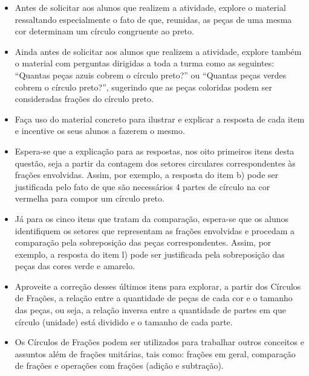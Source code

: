 \begin{multicols}{2}
\begin{orientacoes}
\begin{itemize}
    \item Antes de solicitar aos alunos que realizem a atividade, explore o material ressaltando especialmente o fato de que, reunidas, as peças de uma mesma cor determinam um círculo congruente ao preto.
    \item Ainda antes de solicitar aos alunos que realizem a atividade, explore também o material com perguntas dirigidas a toda a turma como as seguintes: ``Quantas peças azuis cobrem o círculo preto?'' ou ``Quantas peças verdes cobrem o círculo preto?'', sugerindo que as peças coloridas podem ser consideradas frações do círculo preto.
    \item Faça uso do material concreto para ilustrar e explicar a resposta de cada item e incentive os seus alunos a fazerem o mesmo.
    \item Espera-se que a explicação para as respostas, nos oito primeiros itens desta questão, seja a partir da contagem dos setores circulares correspondentes às frações envolvidas. Assim, por exemplo, a resposta do item b) pode ser justificada pelo fato de que são necessários 4 partes de círculo na cor vermelha para compor um círculo preto.
    \item Já para os cinco itens que tratam da comparação, espera-se que os alunos identifiquem os setores que representam as frações envolvidas e procedam a comparação pela sobreposição das peças correspondentes. Assim, por exemplo, a resposta do item l) pode ser justificada pela sobreposição das peças das cores verde e amarelo.
    \item Aproveite a correção desses últimos itens para explorar, a partir dos Círculos de Frações, a relação entre a quantidade de peças de cada cor e o tamanho das peças, ou seja, a relação inversa entre a quantidade de partes em que círculo (unidade) está dividido e o tamanho de cada parte.
    \item Os Círculos de Frações podem ser utilizados para trabalhar outros conceitos e assuntos além de frações unitárias, tais como: frações em geral, comparação de frações e operações com frações (adição e subtração). 
    \end{itemize}
\end{orientacoes}
  \end{multicols}



